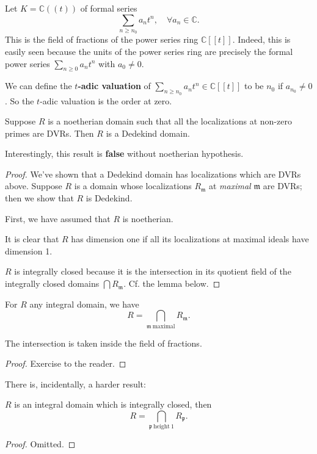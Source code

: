 \begin{example} 
Let $K = \mathbb{C}((t))$ of formal series
\[ \sum_{n \geq n_0} a_n t^n, \quad \forall a_n \in \mathbb{C}.  \]
This is the field of fractions of the power series ring $\mathbb{C}[[t]]$.
Indeed, this is easily seen because the units of the power series ring are
precisely the formal power series $\sum_{n \geq 0} a_n t^n$ with $a_0 \neq 0$. 

We can define the \textbf{$t$-adic valuation} of $\sum_{n \geq n_0} a_n t^n \in
\mathbb{C}[[t]]$ to be $n_0$ if $a_{n_0} \neq 0$. So the $t$-adic valuation is
the order at zero.
\end{example} 

\begin{theorem} 
Suppose $R$ is a noetherian domain such that all the localizations at non-zero primes are DVRs. Then $R$ is a
Dedekind domain.  
\end{theorem} 

Interestingly, this result is \textbf{false} without noetherian hypothesis.
\begin{proof} 
We've shown that a Dedekind domain has localizations which are DVRs above.
Suppose $R$ is a domain whose localizations $R_{\mathfrak{m}}$ at
\emph{maximal} $\mathfrak{m}$ are DVRs; then we show that $R$ is Dedekind.

First, we  have assumed that $R$ is noetherian. 

It is clear that $R$ has dimension one if all its localizations at maximal
ideals have dimension 1.

$R$ is integrally closed because it is the intersection in its quotient field
of the integrally closed domains $\bigcap R_{\mathfrak{m}}$.  Cf. the lemma
below.
\end{proof} 

\begin{lemma} 
For $R$ any integral domain, we have
\[ R = \bigcap_{\mathfrak{m} \ \mathrm{maximal}} R_{\mathfrak{m}} . \]

The intersection is taken inside the field of fractions.
\end{lemma} 

\begin{proof} 
Exercise to the reader.
\end{proof} 

There is, incidentally, a harder result:
\begin{theorem} 
$R$ is an integral domain which is integrally closed, then 
\[ R = \bigcap_{\mathfrak{p} \ \mathrm{height \ }1 } R_{\mathfrak{p}}.	  \]
\end{theorem} 
\begin{proof} 
Omitted.
\end{proof} 



